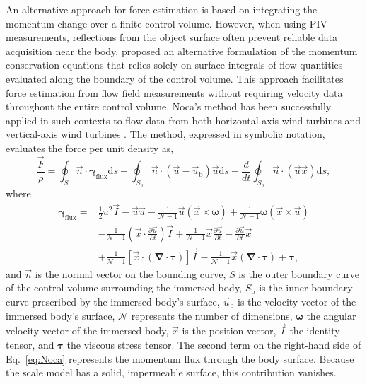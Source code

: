 \documentclass[wes, manuscript]{copernicus}
\begin{document}
An alternative approach for force estimation is based on integrating the momentum change over a finite control volume. However, when using PIV measurements, reflections from the object surface often prevent reliable data acquisition near the body. \cite{Noca1999} proposed an alternative formulation of the momentum conservation equations that relies solely on surface integrals of flow quantities evaluated along the boundary of the control volume. This approach facilitates force estimation from flow field measurements without requiring velocity data throughout the entire control volume. Noca's method has been successfully applied in such contexts to flow data from both horizontal-axis wind turbines \citep{Fritz2024a, Fritz2024b} and vertical-axis wind turbines \citep{LeBlanc2022}.
The method, expressed in symbolic notation, evaluates the force per unit density as,
\begin{equation}\label{eq:Noca}
    \frac{\vec{F}}{\rho} = \oint_{{S}} \vec{n}\cdot \boldsymbol{\gamma}_\textrm{flux}   \textrm{d}s - \oint_{{S}_{\textrm{b}}} \vec{n}\cdot \left(\vec{u} - \vec{u}_{\textrm{b}}\right) \vec{u}   \textrm{d}s - \frac{{d}}{{d}t} \oint_{{S}_{\textrm{b}}} \vec{n}\cdot \left(\vec{u}\vec{x}\right)   \textrm{d}s ,
\end{equation}
where
\begin{equation}\label{eq:Flux}
    \begin{split}
        \boldsymbol{\gamma}_\textrm{flux} = & \frac{1}{2} u^2 \vec{I} - \vec{u}\vec{u} - \frac{1}{\mathscr{N}-1} \vec{u} \left(\vec{x}\times\boldsymbol{\omega}\right)  + \frac{1}{\mathscr{N}-1} \boldsymbol{\omega} \left(\vec{x}\times \vec{u}\right) \\
        & -\frac{1}{\mathscr{N}-1} \left(\vec{x}\cdot \frac{\partial\vec{u}}{\partial t}\right) \vec{I} + \frac{1}{\mathscr{N}-1} \vec{x} \frac{\partial\vec{u}}{\partial t} - \frac{\partial\vec{u}}{\partial t}\vec{x}\\
        & +\frac{1}{\mathscr{N}-1} \left[\vec{x} \cdot \left(\boldsymbol{\nabla} \cdot\boldsymbol{\tau} \right)\right] \vec{I} - \frac{1}{\mathscr{N}-1} \vec{x} \left( \boldsymbol{\nabla}\cdot \boldsymbol{\tau}\right) + \boldsymbol{\tau} ,
\end{split}
\end{equation}
and $\vec{n}$ is the normal vector on the bounding curve, $S$ is the outer boundary curve of the control volume surrounding the immersed body, $S_{\textrm{b}}$ is the inner boundary curve prescribed by the immersed body's surface, $\vec{u}_{\textrm{b}}$ is the velocity vector of the immersed body's surface, $\mathscr{N}$ represents the number of dimensions, $\boldsymbol{\omega}$ the angular velocity vector of the immersed body, $\vec{x}$ is the position vector, $\vec{I}$ the identity tensor, and $\boldsymbol{\tau}$ the viscous stress tensor. The second term on the right-hand side of Eq.~\eqref{eq:Noca} represents the momentum flux through the body surface. Because the scale model has a solid, impermeable surface, this contribution vanishes. 
\end{document}
